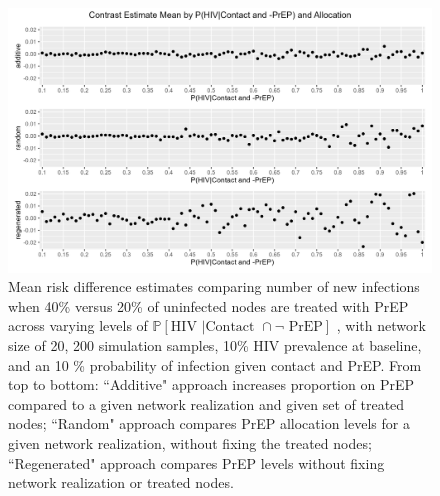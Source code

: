\documentclass{article}
\theoremstyle{definition}
\begin{document}
\begin{figure}[H]
    \centering
    \includegraphics[width=\linewidth]{Figures/p1 Mean plots.png}
    \caption{Mean risk difference estimates comparing number of new infections when 40\% versus 20\% of uninfected nodes are treated with PrEP across varying levels of  $\mathbb{P}\left[\text{HIV } \vert \text {Contact } \cap \neg \text{ PrEP}\right]$ , with network size of 20,  200 simulation samples,  10\% HIV prevalence at baseline, and an 10 \% probability of infection given contact and PrEP.
    From top to bottom: ``Additive" approach increases proportion on PrEP compared to a given network realization and given set of treated nodes; ``Random" approach compares PrEP allocation levels for a given network realization, without fixing the treated nodes; ``Regenerated" approach compares PrEP levels without fixing network realization or treated nodes.}
    \label{fig:Figure 11}
\end{figure}
\end{document}
